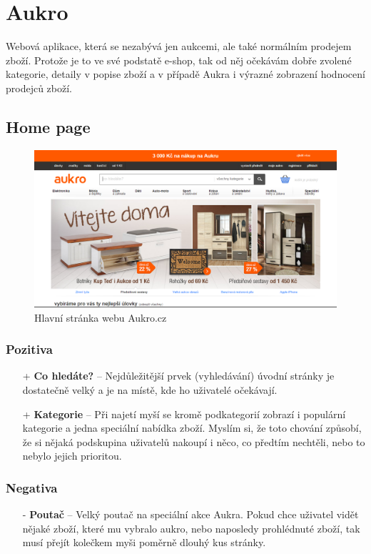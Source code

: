 \section{Aukro \cite{aukro}}

\label{analyza:aukro}

Webová aplikace, která se nezabývá jen aukcemi, ale také normálním prodejem zboží. Protože je to ve své podstatě e-shop, tak od něj očekávám dobře zvolené kategorie, detaily v popise zboží a v případě Aukra i výrazné zobrazení hodnocení prodejců zboží.

\subsection{Home page}
\begin{figure}[h]
    \centering
    \includegraphics[width=1.0\textwidth]{media/aukro/home.png}
    \caption{Hlavní stránka webu Aukro.cz}
    \label{fig:aukro:home}
\end{figure}
\subsubsection*{Pozitiva}
\begin{itemize}
    \item[+] \textbf{Co hledáte?} -- Nejdůležitější prvek (vyhledávání) úvodní stránky je dostatečně velký a je na místě, kde ho uživatelé očekávají.
    \item[+] \textbf{Kategorie} -- Při najetí myší se kromě podkategorií zobrazí i populární kategorie a jedna speciální nabídka zboží. Myslím si, že toto chování způsobí, že si nějaká podskupina uživatelů nakoupí i něco, co předtím nechtěli, nebo to nebylo jejich prioritou.
\end{itemize}
\subsubsection*{Negativa}
\begin{itemize}
    \item[-] \textbf{Poutač} -- Velký poutač na speciální akce Aukra. Pokud chce uživatel vidět nějaké zboží, které mu vybralo aukro, nebo naposledy prohlédnuté zboží, tak musí přejít kolečkem myši poměrně dlouhý kus stránky.
\end{itemize}


